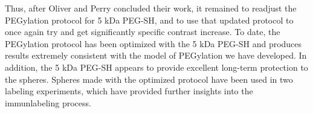 Thus, after Oliver and Perry concluded their work, it remained to readjust the PEGylation protocol for 5 kDa PEG-SH, and to use that updated protocol to once again try and get significantly specific contrast increase. To date, the PEGylation protocol has been optimized with the 5 kDa PEG-SH and produces results extremely consistent with the model of PEGylation we have developed. In addition, the 5 kDa PEG-SH appears to provide excellent long-term protection to the spheres. Spheres made with the optimized protocol have been used in two labeling experiments, which have provided further insights into the immunlabeling process.




